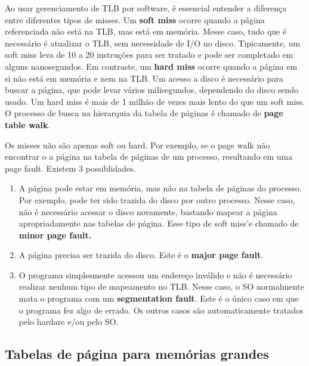 \documentclass[10pt]{article}
\begin{document}
\par Ao usar gerenciamento de TLB por software, é essencial entender a diferença entre diferentes tipos 
de misses. Um \textbf{soft miss} ocorre quando a página referenciada não está na TLB, mas está em memória.
Messe caso, tudo que é necessário é atualizar o TLB, sem necessidade de I/O no disco. Tipicamente, um
soft miss leva de 10 a 20 instruções para ser tratado e pode ser completado em alguns nanosegundos.
Em contraste, um \textbf{hard miss} ocorre quando a página em si não está em memória e nem na TLB.
Um acesso a disco é necessário para buscar a página, que pode levar vários milisegundos, dependendo
do disco sendo usado. Um hard miss é mais de 1 milhão de vezes mais lento do que um soft miss. 
O processo de busca na hierarquia da tabela de páginas é chamado de \textbf{page table walk}.

\par Os misses não são apenas soft ou hard. Por exemplo, se o page walk não encontrar o a página
na tabela de páginas de um processo, resultando em uma page fault. Existem 3 possiblidades.
\begin{enumerate}
    \item A página pode estar em memória, mas não na tabela de páginas do processo. Por exemplo,
        pode ter sido trazida do disco por outro processo. Nesse caso, não é necessário 
        acessar o disco novamente, bastando mapear a página apropriadamente nas tabelas
        de página. Esse tipo de soft miss'e chamado de \textbf{minor page fault.}
    \item A página precisa ser trazida do disco. Este é o \textbf{major page fault}.
    \item O programa simplesmente acessou um endereço inválido e não é necessário realizar
        nenhum tipo de mapeamento no TLB. Nesse caso, o SO normalmente mata o programa
        com um \textbf{segmentation fault}. Este é o único caso em que o programa fez
        algo de errado. Os outros casos são automaticamente tratados pelo hardare e/ou
        pelo SO.
\end{enumerate}

\subsection{Tabelas de página para memórias grandes}
\end{document}
